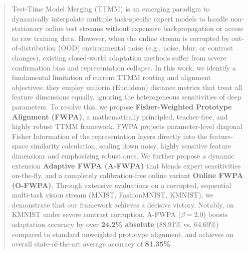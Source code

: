 \documentclass{article}
\theoremstyle{plain}
\theoremstyle{definition}
\theoremstyle{remark}
\begin{document}

\printAffiliationsAndNotice{}

\begin{abstract}
Test-Time Model Merging (TTMM) is an emerging paradigm to dynamically interpolate multiple task-specific expert models to handle non-stationary online test streams without expensive backpropagation or access to raw training data. However, when the online stream is corrupted by out-of-distribution (OOD) environmental noise (e.g., noise, blur, or contrast changes), existing closed-world adaptation methods suffer from severe confirmation bias and representation collapse. In this work, we identify a fundamental limitation of current TTMM routing and alignment objectives: they employ uniform (Euclidean) distance metrics that treat all feature dimensions equally, ignoring the heterogeneous sensitivities of deep parameters. To resolve this, we propose \textbf{Fisher-Weighted Prototype Alignment (FWPA)}, a mathematically principled, teacher-free, and highly robust TTMM framework. FWPA projects parameter-level diagonal Fisher Information of the representation layers directly into the feature-space similarity calculation, scaling down noisy, highly sensitive feature dimensions and emphasizing robust ones. We further propose a dynamic extension \textbf{Adaptive FWPA (A-FWPA)} that blends expert sensitivities on-the-fly, and a completely calibration-free online variant \textbf{Online FWPA (O-FWPA)}. Through extensive evaluations on a corrupted, sequential multi-task vision stream (MNIST, FashionMNIST, KMNIST), we demonstrate that our framework achieves a decisive victory. Notably, on KMNIST under severe contrast corruption, A-FWPA ($\beta=2.0$) boosts adaptation accuracy by over \textbf{24.2\% absolute} (88.91\% vs. 64.69\%) compared to standard unweighted prototype alignment, and achieves an overall state-of-the-art average accuracy of \textbf{81.35\%}.
\end{abstract}
\end{document}
